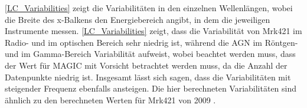 \autoref{LC_Variabilities} zeigt die Variabilitäten in den einzelnen Wellenlängen, wobei die Breite des x-Balkens den Energiebereich angibt, in dem die jeweiligen Instrumente messen.
\autoref{LC_Variabilities} zeigt, dass die Variabilität von Mrk421 im Radio- und im optischen Bereich sehr niedrig ist, während die AGN im Röntgen- und im Gamma-Bereich Variabilität aufweist, wobei beachtet werden muss, dass der Wert für MAGIC mit Vorsicht betrachtet werden muss, da die Anzahl der Datenpunkte niedrig ist.
Insgesamt lässt sich sagen, dass die Variabilitäten mit steigender Frequenz ebenfalls ansteigen.
Die hier berechneten Variabilitäten sind ähnlich zu den berechneten Werten für Mrk421 von 2009 \cite{MWL2009}.

